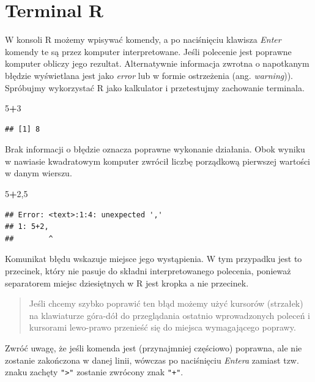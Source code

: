 \documentclass[]{book}
\newenvironment{Shaded}{\begin{snugshade}}{\end{snugshade}}
\newcommand{\DecValTok}[1]{\textcolor[rgb]{0.00,0.00,0.81}{#1}}
\newcommand{\OperatorTok}[1]{\textcolor[rgb]{0.81,0.36,0.00}{\textbf{#1}}}
\newcommand{\NormalTok}[1]{#1}
\theoremstyle{definition}
\theoremstyle{definition}
\theoremstyle{definition}
\theoremstyle{remark}
\begin{document}
\section{Terminal R}\label{terminal-r}

W konsoli R możemy wpisywać komendy, a po naciśnięciu klawisza
\emph{Enter} komendy te są przez komputer interpretowane. Jeśli
polecenie jest poprawne komputer obliczy jego rezultat. Alternatywnie
informacja zwrotna o napotkanym błędzie wyświetlana jest jako
\emph{error} lub w formie ostrzeżenia (ang. \emph{warning})). Spróbujmy
wykorzystać R jako kalkulator i przetestujmy zachowanie terminala.

\begin{Shaded}
\begin{Highlighting}[]
\DecValTok{5}\OperatorTok{+}\DecValTok{3}
\end{Highlighting}
\end{Shaded}

\begin{verbatim}
## [1] 8
\end{verbatim}

Brak informacji o błędzie oznacza poprawne wykonanie działania. Obok
wyniku w nawiasie kwadratowym komputer zwrócił liczbę porządkową
pierwszej wartości w danym wierszu.

\begin{Shaded}
\begin{Highlighting}[]
\DecValTok{5}\OperatorTok{+}\DecValTok{2}\NormalTok{,}\DecValTok{5}
\end{Highlighting}
\end{Shaded}

\begin{verbatim}
## Error: <text>:1:4: unexpected ','
## 1: 5+2,
##        ^
\end{verbatim}

Komunikat błędu wskazuje miejsce jego wystąpienia. W tym przypadku jest
to przecinek, który nie pasuje do składni interpretowanego polecenia,
ponieważ separatorem miejsc dziesiętnych w R jest kropka a nie
przecinek.

\begin{quote}
Jeśli chcemy szybko poprawić ten błąd możemy użyć kursorów (strzałek) na
klawiaturze góra-dół do przeglądania ostatnio wprowadzonych poleceń i
kursorami lewo-prawo przenieść się do miejsca wymagającego poprawy.
\end{quote}

Zwróć uwagę, że jeśli komenda jest (przynajmniej częściowo) poprawna,
ale nie zostanie zakończona w danej linii, wówczas po naciśnięciu
\emph{Entera} zamiast tzw. znaku zachęty \texttt{"\textgreater{}"}
zostanie zwrócony znak \texttt{"+"}.
\end{document}

